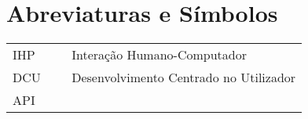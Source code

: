 \chapter*{Abreviaturas e Símbolos}

\begin{flushleft}
\begin{tabular}{l p{0.8\linewidth}}
IHP     & Interação Humano-Computador\\
DCU     & Desenvolvimento Centrado no Utilizador\\
API
\end{tabular}
\end{flushleft}

